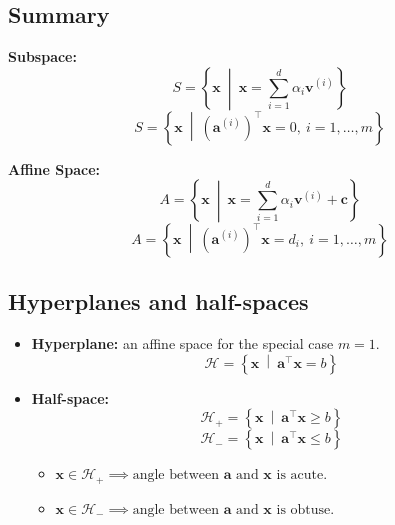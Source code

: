 \subsection{Summary}
\begin{definition}

    \textbf{Subspace:}
    \[
    S = \left\{ \mathbf{x} \ \middle| \ \mathbf{x} = \sum_{i=1}^{d} \alpha_i \mathbf{v}^{(i)} \right\}
    \]
    \[
    S = \left\{ \mathbf{x} \ \middle| \ (\mathbf{a}^{(i)})^\top \mathbf{x} = 0 , \ i=1, \dots, m \right\}
    \]

    \textbf{Affine Space:}
    \[
    A = \left\{ \mathbf{x} \ \middle| \ \mathbf{x} = \sum_{i=1}^{d} \alpha_i \mathbf{v}^{(i)} + \mathbf{c} \right\}
    \]
    \[
    A = \left\{ \mathbf{x} \ \middle| \ (\mathbf{a}^{(i)})^\top \mathbf{x} = d_i , \ i=1, \dots, m \right\}
    \]
\end{definition}
        
\subsection{Hyperplanes and half-spaces}
\begin{definition}

    \begin{itemize}
        \item \textbf{Hyperplane:} an affine space for the special case \( m = 1 \).
            \begin{equation}
                \mathcal{H} = \left\{ \mathbf{x} \ \middle| \ \mathbf{a}^\top \mathbf{x} = b \right\}
            \end{equation}
    
        \item \textbf{Half-space:}
            \begin{equation}
                \mathcal{H}_{+} = \left\{ \mathbf{x} \ \middle| \ \mathbf{a}^\top \mathbf{x} \geq b \right\}
            \end{equation}
            \begin{equation}
                \mathcal{H}_{-} = \left\{ \mathbf{x} \ \middle| \ \mathbf{a}^\top \mathbf{x} \leq b \right\}
            \end{equation}
            \begin{itemize}
                \item $\mathbf{x} \in \mathcal{H}_{+} \implies \text{angle between } \mathbf{a} \text{ and } \mathbf{x} \text{ is acute.}$
                \item $\mathbf{x} \in \mathcal{H}_{-} \implies \text{angle between } \mathbf{a} \text{ and } \mathbf{x} \text{ is obtuse.}$
            \end{itemize}
    \end{itemize}

\end{definition}

